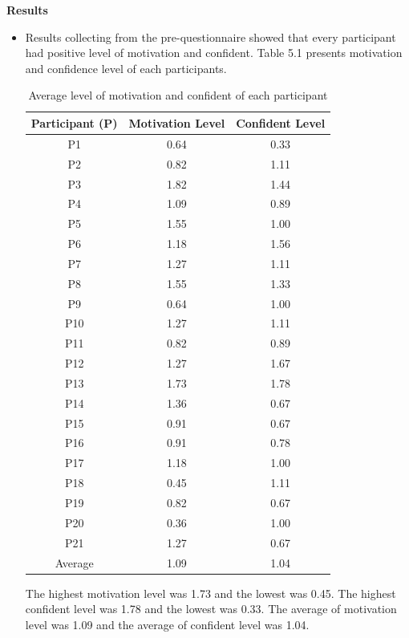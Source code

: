 \noindent\textbf{Results} 
\begin{itemize}
\item Results collecting from the pre-questionnaire showed that every participant had positive level of motivation and confident. Table 5.1 presents motivation and confidence level of each participants.
\newpage 
\begin{table}[H]
\centering
\setlength{\tabcolsep}{4pt}
\caption{Average level of motivation and confident of each participant}
\begin{tabular}{|c|c|c|} \hline
Participant (P) & Motivation Level & Confident Level\\
\hline
P1 & 0.64  &\cellcolor{red!25}0.33  \\
\hline 
P2 & 0.82 & 1.11   \\
\hline 
P3 & 1.82  & 1.44 \\
\hline 
P4 & 1.09 & 0.89  \\
\hline 
P5 & 1.55  & 1.00  \\
\hline 
P6 & 1.18  & 1.56  \\
\hline 
P7 & 1.27  & 1.11  \\
\hline 
P8 & 1.55  & 1.33  \\
\hline 
P9 & 0.64  & 1.00  \\
\hline 
P10 & 1.27  & 1.11  \\
\hline 
P11 & 0.82  & 0.89  \\
\hline 
P12 & 1.27  & 1.67  \\
\hline 
P13 & \cellcolor{blue!25}1.73  & \cellcolor{blue!25}1.78  \\
\hline 
P14 & 1.36  & 0.67  \\
\hline 
P15 & 0.91  & 0.67  \\
\hline 
P16 & 0.91  & 0.78  \\
\hline 
P17 & 1.18  & 1.00  \\
\hline 
P18 &\cellcolor{red!25}0.45  & 1.11  \\
\hline 
P19 & 0.82  & 0.67  \\
\hline 
P20 & 0.36  & 1.00  \\
\hline 
P21 & 1.27  &  0.67 \\
\hline 
\cellcolor[gray]{0.7}Average & \cellcolor[gray]{0.7}1.09  & \cellcolor[gray]{0.7}1.04 \\
\hline
\end{tabular}
\end{table}

\noindent The highest motivation level was 1.73 and the lowest was 0.45.
\newline \noindent The highest confident level was 1.78 and the lowest was 0.33.
\newline \noindent The average of motivation level was 1.09 and the average of confident level was 1.04.


\end{itemize}
